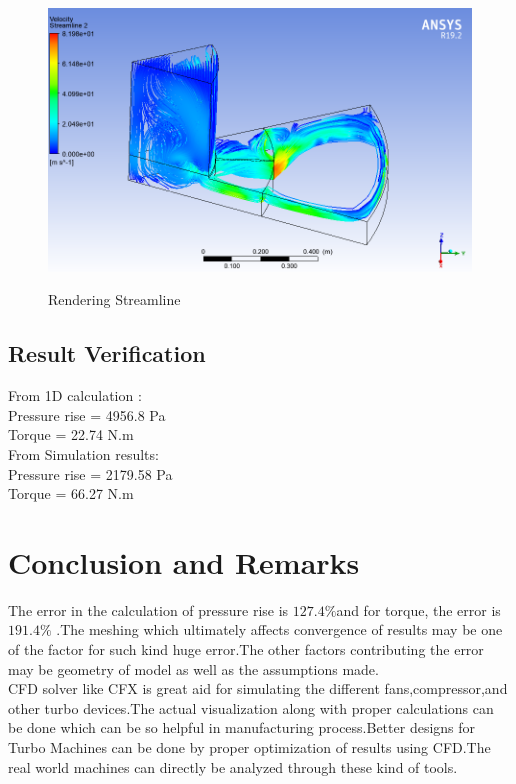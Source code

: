 \documentclass[11pt]{article}
\begin{document}
 \begin{center}
 \begin{figure}[H]
 \centering
 \includegraphics[scale=.6]{streamlineplot.png}\\
 \caption{Rendering Streamline}
 \end{figure}
 \end{center}
 \subsection{Result Verification}
 From 1D calculation :\\
 Pressure rise = 4956.8 Pa\\
 Torque = 22.74 N.m\\
 From Simulation results:\\
 Pressure rise = 2179.58 Pa\\
 Torque = 66.27 N.m \\
 
 \section{Conclusion and Remarks}
 The error in the calculation of pressure rise is $127.4\%$and for torque, the error is  $191.4\%$ .The meshing which ultimately affects convergence of results may be one of the factor for such kind huge error.The other factors contributing the error may be geometry of model as well as the assumptions made.\\
 CFD solver like CFX is great aid for simulating the different fans,compressor,and other turbo devices.The actual visualization along with proper calculations can be done which can be so helpful in manufacturing process.Better designs for Turbo Machines can be done by proper optimization of results using CFD.The real world machines can directly be analyzed through these kind of tools.
 
\end{document}
